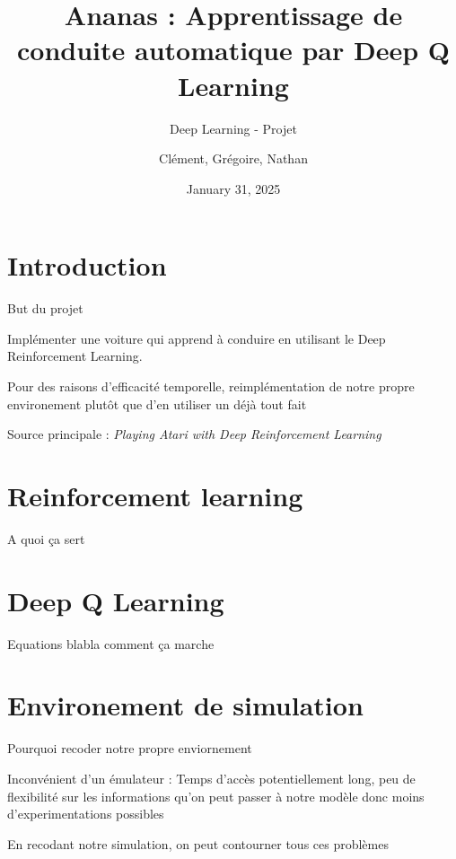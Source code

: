 \documentclass{beamer}
\begin{document}
	
	\title{Ananas : Apprentissage de conduite automatique par Deep Q Learning}
	\subtitle{Deep Learning - Projet}
	\author{Clément, Grégoire, Nathan}
	\date{January 31, 2025}
	
	\maketitle
	
	\section{Introduction}
	
	\begin{frame}{But du projet}
		
		Implémenter une voiture qui apprend à conduire en utilisant le Deep Reinforcement Learning.
		
		Pour des raisons d'efficacité temporelle, reimplémentation de notre propre environement plutôt que d'en utiliser un déjà tout fait
		
		Source principale : \textit{Playing Atari with Deep Reinforcement Learning}
		
	\end{frame}
	
	\section{Reinforcement learning}
	
	\begin{frame}{A quoi ça sert}
	
	\end{frame}
	
	\section{Deep Q Learning}
	
	\begin{frame}{Equations blabla comment ça marche}
		
	\end{frame}
	
	\section{Environement de simulation}
	
	\begin{frame}{Pourquoi recoder notre propre enviornement}
		
		Inconvénient d'un émulateur : Temps d'accès potentiellement long, peu de flexibilité sur les informations qu'on peut passer à notre modèle donc moins d'experimentations possibles
		
		En recodant notre simulation, on peut contourner tous ces problèmes 
		
	\end{frame}
	
\end{document}

